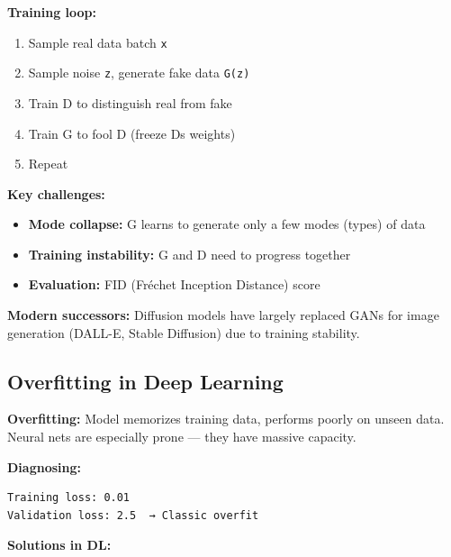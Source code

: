 \documentclass[11pt]{article}
\providecommand{\tightlist}{\setlength{\itemsep}{1pt}\setlength{\parskip}{0pt}}
\begin{document}
\textbf{Training loop:}

\begin{enumerate}
\def\labelenumi{\arabic{enumi}.}
\tightlist
\item
  Sample real data batch \texttt{x}
\item
  Sample noise \texttt{z}, generate fake data \texttt{G(z)}
\item
  Train D to distinguish real from fake
\item
  Train G to fool D (freeze D\textquotesingle s weights)
\item
  Repeat
\end{enumerate}

\textbf{Key challenges:}

\begin{itemize}
\tightlist
\item
  \textbf{Mode collapse:} G learns to generate only a few modes (types) of data
\item
  \textbf{Training instability:} G and D need to progress together
\item
  \textbf{Evaluation:} FID (Fréchet Inception Distance) score
\end{itemize}

\textbf{Modern successors:} Diffusion models have largely replaced GANs for image generation (DALL-E, Stable Diffusion) due to training stability.

\subsection{Overfitting in Deep Learning}\label{overfitting-in-deep-learning}

\textbf{Overfitting:} Model memorizes training data, performs poorly on unseen data. Neural nets are especially prone --- they have massive capacity.

\textbf{Diagnosing:}

\setcodelang{}

\begin{verbatim}
Training loss: 0.01
Validation loss: 2.5  → Classic overfit
\end{verbatim}

\textbf{Solutions in DL:}
\end{document}
